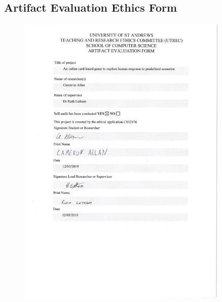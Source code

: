 \documentclass[]{report}
\begin{document}
\begin{appendices}
\newpage
  \section{Artifact Evaluation Ethics Form}
  \begin{figure}[!h]
    \centering
    \includegraphics[width=0.9\textwidth]{./appendices/ethics.pdf}\label{appendix:ethic}
  \end{figure}
  \newpage

\end{appendices}
\end{document}
